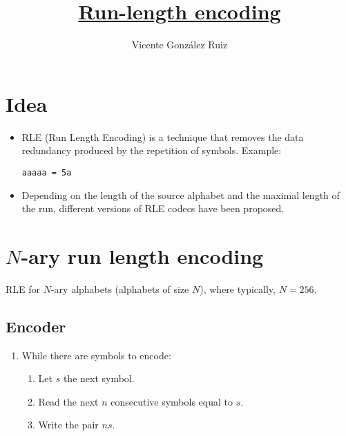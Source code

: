 
\title{\href{https://en.wikipedia.org/wiki/Run-length_encoding}{Run-length encoding}}

\author{Vicente González Ruiz}

\maketitle

\section{Idea}

\begin{itemize}
\item RLE (Run Length Encoding) is a technique that removes the data
  redundancy produced by the repetition of symbols. Example:

\begin{verbatim}
aaaaa = 5a
\end{verbatim}

\item Depending on the length of the source alphabet and the maximal
  length of the run, different versions of RLE codecs have been
  proposed.
\end{itemize}

\section{$N$-ary run length encoding}

RLE for \(N\)-ary alphabets (alphabets of size \(N\)), where typically,
\(N=256\).

\subsection{Encoder}

\begin{enumerate}
\item While there are symbols to encode:
  \tightlist
  \begin{enumerate}
  \tightlist
  \item Let \(s\) the next symbol.
  \item Read the next \(n\) consecutive symbols equal to \(s\).
  \item Write the pair \(ns\).
  \end{enumerate}
\end{enumerate}

